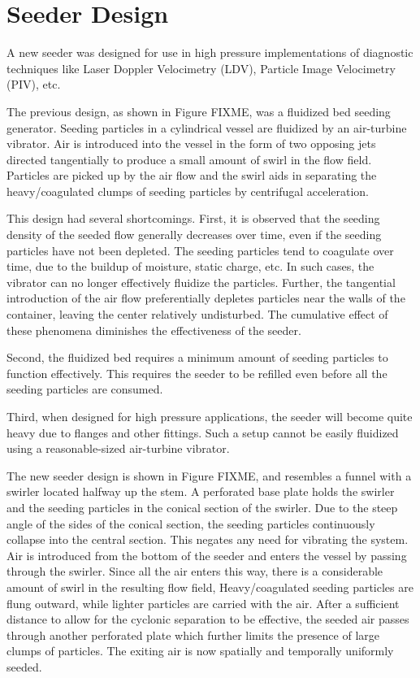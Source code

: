 \chapter{Seeder Design}
\label{app:seeder}

A new seeder was designed for use in high pressure implementations of diagnostic techniques like Laser Doppler Velocimetry (LDV), Particle Image Velocimetry (PIV), etc.

The previous design, as shown in Figure FIXME, was a fluidized bed seeding generator.
Seeding particles in a cylindrical vessel are fluidized by an air-turbine vibrator.
Air is introduced into the vessel in the form of two opposing jets directed tangentially to produce a small amount of swirl in the flow field.
Particles are picked up by the air flow and the swirl aids in separating the heavy/coagulated clumps of seeding particles by centrifugal acceleration.

This design had several shortcomings.
First, it is observed that the seeding density of the seeded flow generally decreases over time, even if the seeding particles have not been depleted.
The seeding particles tend to coagulate over time, due to the buildup of moisture, static charge, etc.
In such cases, the vibrator can no longer effectively fluidize the particles.
Further, the tangential introduction of the air flow preferentially depletes particles near the walls of the container, leaving the center relatively undisturbed.
The cumulative effect of these phenomena diminishes the effectiveness of the seeder.

Second, the fluidized bed requires a minimum amount of seeding particles to function effectively.
This requires the seeder to be refilled even before all the seeding particles are consumed.

Third, when designed for high pressure applications, the seeder will become quite heavy due to flanges and other fittings.
Such a setup cannot be easily fluidized using a reasonable-sized air-turbine vibrator.

The new seeder design is shown in Figure FIXME, and resembles a funnel with a swirler located halfway up the stem.
A perforated base plate holds the swirler and the seeding particles in the conical section of the swirler.
Due to the steep angle of the sides of the conical section, the seeding particles continuously collapse into the central section.
This negates any need for vibrating the system.
Air is introduced from the bottom of the seeder and enters the vessel by passing through the swirler.
Since all the air enters this way, there is a considerable amount of swirl in the resulting flow field,
Heavy/coagulated seeding particles are flung outward, while lighter particles are carried with the air.
After a sufficient distance to allow for the cyclonic separation to be effective, the seeded air passes through another perforated plate which further limits the presence of large clumps of particles.
The exiting air is now spatially and temporally uniformly seeded.

